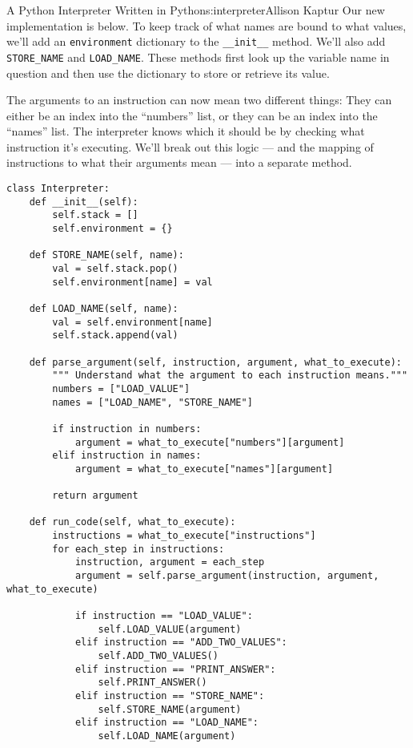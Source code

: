 \begin{aosachapter}{A Python Interpreter Written in Python}{s:interpreter}{Allison Kaptur}
Our new implementation is below. To keep track of what names are bound
to what values, we'll add an \texttt{environment} dictionary to the
\texttt{\_\_init\_\_} method. We'll also add \texttt{STORE\_NAME} and
\texttt{LOAD\_NAME}. These methods first look up the variable name in
question and then use the dictionary to store or retrieve its value.

The arguments to an instruction can now mean two different things: They
can either be an index into the ``numbers'' list, or they can be an
index into the ``names'' list. The interpreter knows which it should be
by checking what instruction it's executing. We'll break out this logic
--- and the mapping of instructions to what their arguments mean ---
into a separate method.

\begin{verbatim}
class Interpreter:
    def __init__(self):
        self.stack = []
        self.environment = {}

    def STORE_NAME(self, name):
        val = self.stack.pop()
        self.environment[name] = val

    def LOAD_NAME(self, name):
        val = self.environment[name]
        self.stack.append(val)

    def parse_argument(self, instruction, argument, what_to_execute):
        """ Understand what the argument to each instruction means."""
        numbers = ["LOAD_VALUE"]
        names = ["LOAD_NAME", "STORE_NAME"]

        if instruction in numbers:
            argument = what_to_execute["numbers"][argument]
        elif instruction in names:
            argument = what_to_execute["names"][argument]

        return argument

    def run_code(self, what_to_execute):
        instructions = what_to_execute["instructions"]
        for each_step in instructions:
            instruction, argument = each_step
            argument = self.parse_argument(instruction, argument, what_to_execute)

            if instruction == "LOAD_VALUE":
                self.LOAD_VALUE(argument)
            elif instruction == "ADD_TWO_VALUES":
                self.ADD_TWO_VALUES()
            elif instruction == "PRINT_ANSWER":
                self.PRINT_ANSWER()
            elif instruction == "STORE_NAME":
                self.STORE_NAME(argument)
            elif instruction == "LOAD_NAME":
                self.LOAD_NAME(argument)
\end{verbatim}


\end{aosachapter}
